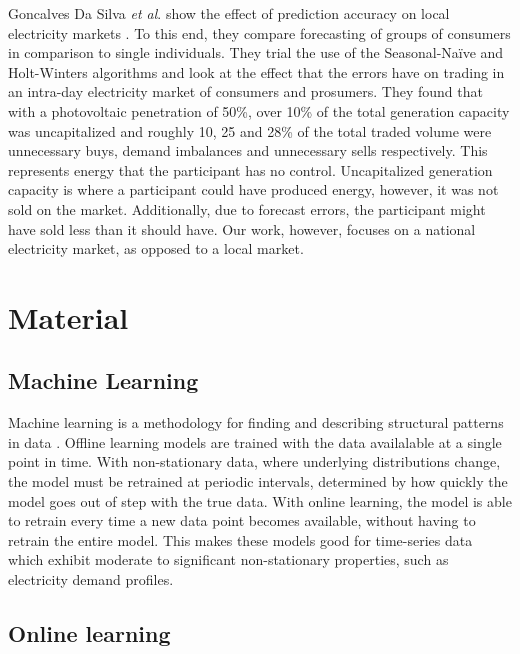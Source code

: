 \documentclass[final,3p,times,twocolumn,numbers]{elsarticle}
\begin{document}
Goncalves Da Silva \textit{et al}. show the effect of prediction accuracy on local electricity markets \cite{GoncalvesDaSilva2014}. To this end, they compare forecasting of groups of consumers in comparison to single individuals. They trial the use of the Seasonal-Naïve and Holt-Winters algorithms and look at the effect that the errors have on trading in an intra-day electricity market of consumers and prosumers. They found that with a photovoltaic penetration of 50\%, over 10\% of the total generation capacity was uncapitalized and roughly 10, 25 and 28\% of the total traded volume were unnecessary buys, demand imbalances and unnecessary sells respectively. This represents energy that the participant has no control. Uncapitalized generation capacity is where a participant could have produced energy, however, it was not sold on the market. Additionally, due to forecast errors, the participant might have sold less than it should have. Our work, however, focuses on a national electricity market, as opposed to a local market.





\section{Material}
\label{sec:material}

\subsection{Machine Learning}

Machine learning is a methodology for finding and describing structural patterns in data \cite{Witten2011}. Offline learning models are trained with the data availalable at a single point in time. With non-stationary data, where underlying distributions change, the model must be retrained at periodic intervals, determined by how quickly the model goes out of step with the true data. With online learning, the model is able to retrain every time a new data point becomes available, without having to retrain the entire model. This makes these models good for time-series data which exhibit moderate to significant non-stationary properties, such as electricity demand profiles.





\subsection{Online learning}
\end{document}
